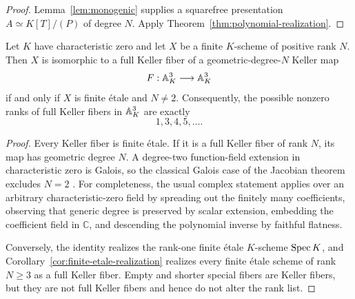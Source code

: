 \begin{proof}
Lemma~\ref{lem:monogenic} supplies a squarefree presentation
\(A\simeq K[T]/(P)\) of degree \(N\).  Apply
Theorem~\ref{thm:polynomial-realization}.
\end{proof}

\begin{corollary}
\label{cor:rank-classification}
Let \(K\) have characteristic zero and let \(X\) be a finite \(K\)-scheme
of positive rank \(N\).  Then \(X\) is
isomorphic to a full Keller fiber of a geometric-degree-\(N\) Keller map
\[
 F:\mathbb A^3_K\longrightarrow\mathbb A^3_K
\]
if and only if \(X\) is finite \'etale and \(N\neq2\).  Consequently, the
possible nonzero ranks of full Keller fibers in \(\mathbb A^3_K\) are exactly
\[
 \boxed{1,3,4,5,\ldots}.
\]
\end{corollary}

\begin{proof}
Every Keller fiber is finite \'etale.  If it is a full Keller fiber of rank
\(N\), its map has geometric degree \(N\).  A degree-two function-field
extension in characteristic zero is Galois, so the classical Galois case of
the Jacobian theorem excludes \(N=2\)
\cite{Campbell,Razar,Wright}.  For completeness, the usual complex statement
applies over an arbitrary characteristic-zero field by spreading out the
finitely many coefficients, observing that generic degree is preserved by
scalar extension, embedding the coefficient field in \(\mathbb C\), and
descending the polynomial inverse by faithful flatness.

Conversely, the identity realizes the rank-one finite \'etale \(K\)-scheme
\(\operatorname{Spec} K\), and
Corollary~\ref{cor:finite-etale-realization} realizes every finite \'etale
scheme of rank \(N\geq3\) as a full Keller fiber.  Empty and shorter special
fibers are Keller fibers, but they are not full Keller fibers and hence do
not alter the rank list.
\end{proof}


